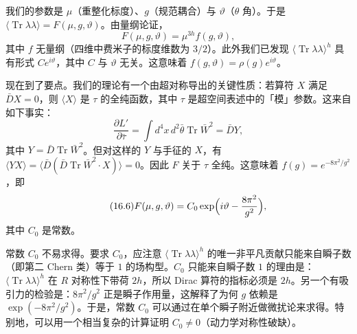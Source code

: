 我们的参数是 $\mu$（重整化标度）、$g$（规范耦合）与 $\vartheta$（$\theta$ 角）。于是 $\langle\operatorname{Tr}\lambda\lambda\rangle=F(\mu,g,\vartheta)$。由量纲论证，
\[
F(\mu,g,\vartheta)=\mu^{3h}f(g,\vartheta),
\]
其中 $f$ 无量纲（四维中费米子的标度维数为 $3/2$）。此外我们已发现 $\langle\operatorname{Tr}\lambda\lambda\rangle^h$ 具有形式 $Ce^{i\vartheta}$，其中 $C$ 与 $\vartheta$ 无关。这意味着 $f(g,\vartheta)=\rho(g)e^{i\vartheta}$。

现在到了要点。我们的理论有一个由超对称导出的关键性质：若算符 $X$ 满足 $\bar DX=0$，则 $\langle X\rangle$ 是 $\tau$ 的全纯函数，其中 $\tau$ 是超空间表述中的「模」参数。这来自如下事实：
\[
\frac{\partial L'}{\partial\bar\tau}=\int d^4x\,d^2\bar\theta\operatorname{Tr}\bar W^2=\bar DY,
\]
其中 $Y=\bar D\operatorname{Tr}\bar W^2$。但对这样的 $Y$ 与手征的 $X$，有 $\langle YX\rangle=\langle\bar D(\bar D\operatorname{Tr}\bar W^2\cdot X)\rangle=0$。因此 $F$ 关于 $\tau$ 全纯。这意味着 $f(g)=e^{-8\pi^2/g^2}$，即
\begin{equation}
  \tag{16.6}
  \label{eq:16-6}
  F(\mu,g,\vartheta)=C_0\exp\Bigl(i\vartheta-\frac{8\pi^2}{g^2}\Bigr),
\end{equation}
其中 $C_0$ 是常数。



常数 $C_0$ 不易求得。要求 $C_0$，应注意 $\langle\operatorname{Tr}\lambda\lambda\rangle^h$ 的唯一非平凡贡献只能来自瞬子数（即第二 Chern 类）等于 $1$ 的场构型。$C_0$ 只能来自瞬子数 $1$ 的理由是：$\langle\operatorname{Tr}\lambda\lambda\rangle^h$ 在 $R$ 对称性下带荷 $2h$，所以 Dirac 算符的指标必须是 $2h$。另一个有吸引力的检验是：$8\pi^2/g^2$ 正是瞬子作用量，这解释了为何 $g$ 依赖是 $\exp(-8\pi^2/g^2)$。于是，常数 $C_0$ 可以通过在单个瞬子附近做微扰论来求得。特别地，可以用一个相当复杂的计算证明 $C_0\ne0$（动力学对称性破缺）。

